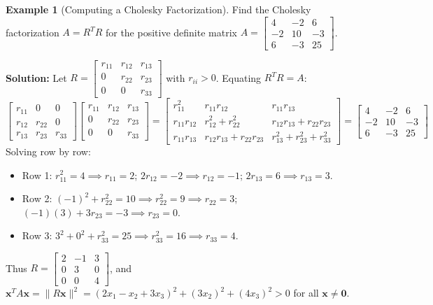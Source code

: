 \documentclass[11pt, letterpaper]{article}
\theoremstyle{definition}
\newtheorem{example}{Example}[section]
\theoremstyle{remark}
\begin{document}
\begin{example}[Computing a Cholesky Factorization]
Find the Cholesky factorization $A = R^T R$ for the positive definite matrix $A = \begin{bmatrix} 4 & -2 & 6 \\ -2 & 10 & -3 \\ 6 & -3 & 25 \end{bmatrix}$.

\textbf{Solution:} Let $R = \begin{bmatrix} r_{11} & r_{12} & r_{13} \\ 0 & r_{22} & r_{23} \\ 0 & 0 & r_{33} \end{bmatrix}$ with $r_{ii} > 0$. Equating $R^T R = A$:
\[
\begin{bmatrix} r_{11} & 0 & 0 \\ r_{12} & r_{22} & 0 \\ r_{13} & r_{23} & r_{33} \end{bmatrix} \begin{bmatrix} r_{11} & r_{12} & r_{13} \\ 0 & r_{22} & r_{23} \\ 0 & 0 & r_{33} \end{bmatrix} = \begin{bmatrix} r_{11}^2 & r_{11}r_{12} & r_{11}r_{13} \\ r_{11}r_{12} & r_{12}^2 + r_{22}^2 & r_{12}r_{13} + r_{22}r_{23} \\ r_{11}r_{13} & r_{12}r_{13} + r_{22}r_{23} & r_{13}^2 + r_{23}^2 + r_{33}^2 \end{bmatrix} = \begin{bmatrix} 4 & -2 & 6 \\ -2 & 10 & -3 \\ 6 & -3 & 25 \end{bmatrix}
\]
Solving row by row:
\begin{itemize}
    \item Row 1: $r_{11}^2 = 4 \implies r_{11} = 2$; \quad $2r_{12} = -2 \implies r_{12} = -1$; \quad $2r_{13} = 6 \implies r_{13} = 3$.
    \item Row 2: $(-1)^2 + r_{22}^2 = 10 \implies r_{22}^2 = 9 \implies r_{22} = 3$; \quad $(-1)(3) + 3r_{23} = -3 \implies r_{23} = 0$.
    \item Row 3: $3^2 + 0^2 + r_{33}^2 = 25 \implies r_{33}^2 = 16 \implies r_{33} = 4$.
\end{itemize}
Thus $R = \begin{bmatrix} 2 & -1 & 3 \\ 0 & 3 & 0 \\ 0 & 0 & 4 \end{bmatrix}$, and $\mathbf{x}^T A \mathbf{x} = \|R\mathbf{x}\|^2 = (2x_1 - x_2 + 3x_3)^2 + (3x_2)^2 + (4x_3)^2 > 0$ for all $\mathbf{x} \neq \mathbf{0}$.
\end{example}
\end{document}
